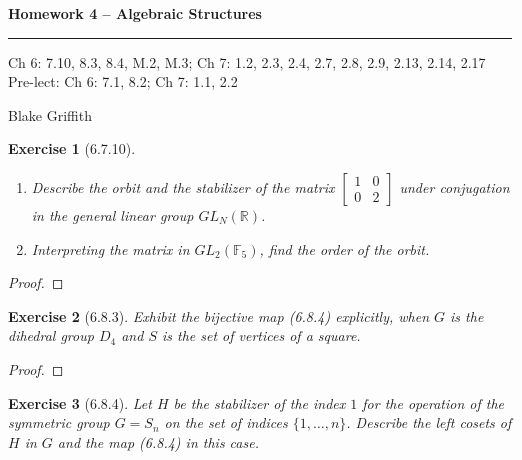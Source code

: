\documentclass[12pt]{article}
\newtheorem*{exer}{Exercise}
\begin{document}
\textbf{Homework 4 -- Algebraic Structures} \\

\hrule

\begin{minipage}{.80\linewidth}
    \flushleft
    Ch 6: 7.10, 8.3, 8.4, M.2, M.3; Ch 7: 1.2, 2.3, 2.4, 2.7, 2.8, 2.9,
    2.13, 2.14, 2.17 \\
    Pre-lect: Ch 6: 7.1, 8.2; Ch 7: 1.1, 2.2 \\
\end{minipage}
\begin{minipage}{.20\linewidth}
    \flushright
    Blake Griffith
\end{minipage}

\begin{exer}[6.7.10]
    \begin{enumerate}
        \item Describe the orbit and the stabilizer of the matrix
            $\left[
                \begin{array}{cc}
                    1 & 0 \\
                    0 & 2 
                \end{array}
            \right]$
            under conjugation in the general linear group $GL_N (
            \mathbb{R})$.

        \item Interpreting the matrix in $GL_2(\mathbb{F}_5)$, find
            the order of the orbit.
    \end{enumerate}
\end{exer}

\begin{proof}

\end{proof}


\begin{exer}[6.8.3]
    Exhibit the bijective map (6.8.4) explicitly, when $G$ is the
    dihedral group $D_4$ and $S$ is the set of vertices of a square.
\end{exer}

\begin{proof}

\end{proof}


\begin{exer}[6.8.4]
    Let $H$ be the stabilizer of the index $1$ for the operation of the
    symmetric group $G = S_n$ on the set of indices $\{1, \dots, n\}$.
    Describe the left cosets of $H$ in $G$ and the map (6.8.4) in this
    case.
\end{exer}
\end{document}
